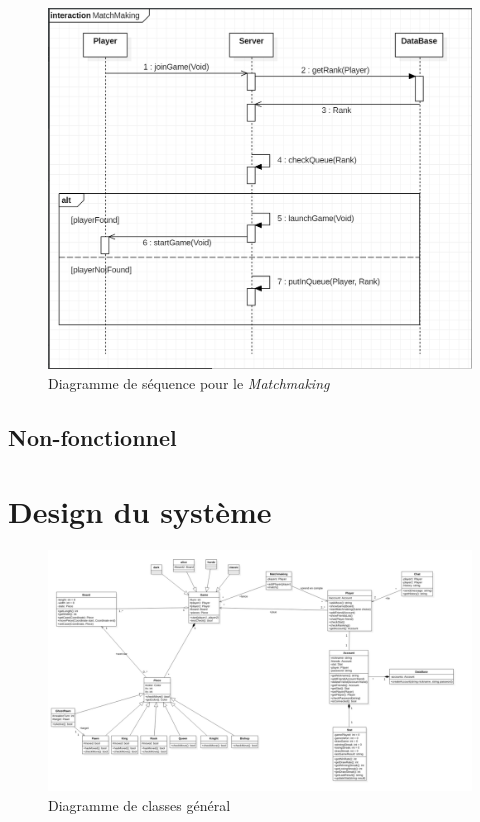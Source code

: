 \documentclass[10pt, a4paper]{article}
\begin{document}
\begin{figure}[ht]
\centering
\includegraphics[scale=0.45]{SequenceDiagramMatchmaking.PNG}
\caption{Diagramme de séquence pour le \textit{Matchmaking}}
\label{SD_matchmaker} %
\end{figure}
		
		\subsection{Non-fonctionnel}
		
	\section{Design du système}
	
\begin{figure}[ht]
\centering
\includegraphics[scale=0.4]{ClassDiagram.png}
\caption{Diagramme de classes général}
\label{CD} %
\end{figure}
		
\end{document}
